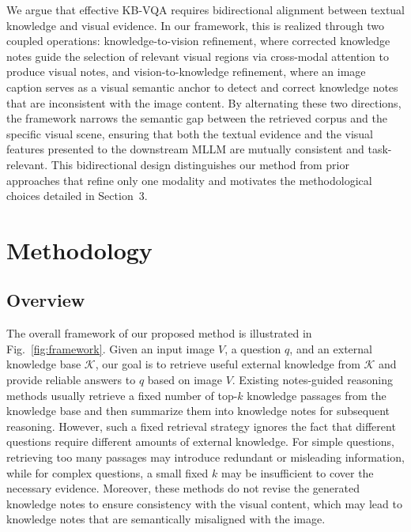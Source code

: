 \documentclass[manuscript,screen,review]{acmart}
\begin{document}
We argue that effective KB-VQA requires bidirectional alignment between textual knowledge and visual evidence. In our framework, this is realized through two coupled operations: knowledge-to-vision refinement, where corrected knowledge notes guide the selection of relevant visual regions via cross-modal attention to produce visual notes, and vision-to-knowledge refinement, where an image caption serves as a visual semantic anchor to detect and correct knowledge notes that are inconsistent with the image content. By alternating these two directions, the framework narrows the semantic gap between the retrieved corpus and the specific visual scene, ensuring that both the textual evidence and the visual features presented to the downstream MLLM are mutually consistent and task-relevant. This bidirectional design distinguishes our method from prior approaches that refine only one modality and motivates the methodological choices detailed in Section~3.

\section{Methodology}

\subsection{Overview}

The overall framework of our proposed method is illustrated in Fig.~\ref{fig:framework}. Given an input image $V$, a question $q$, and an external knowledge base $\mathcal{K}$, our goal is to retrieve useful external knowledge from $\mathcal{K}$ and provide reliable answers to $q$ based on image $V$. Existing notes-guided reasoning methods usually retrieve a fixed number of top-$k$ knowledge passages from the knowledge base and then summarize them into knowledge notes for subsequent reasoning. However, such a fixed retrieval strategy ignores the fact that different questions require different amounts of external knowledge. For simple questions, retrieving too many passages may introduce redundant or misleading information, while for complex questions, a small fixed $k$ may be insufficient to cover the necessary evidence. Moreover, these methods do not revise the generated knowledge notes to ensure consistency with the visual content, which may lead to knowledge notes that are semantically misaligned with the image.
\end{document}
